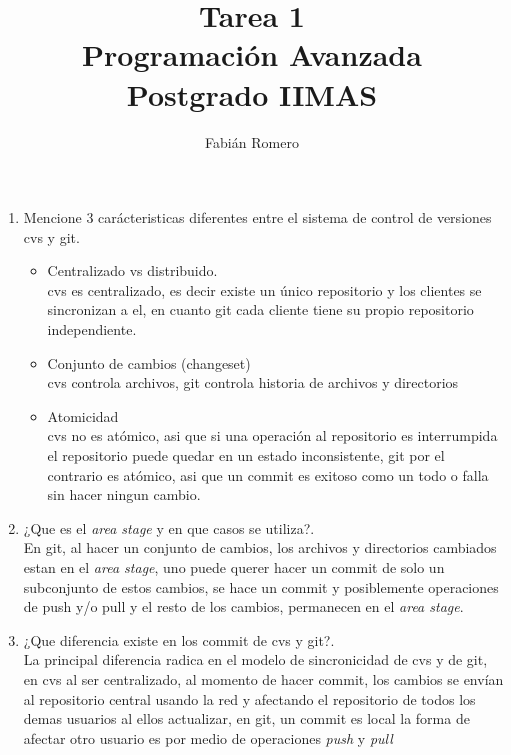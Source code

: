 \documentclass[12pt]{article}
\title{Tarea 1 \\ Programación Avanzada \\ Postgrado IIMAS }
\author{Fabián Romero}
\begin{document}
\lstset{language=bash,basicstyle=\tiny}
\maketitle

\begin{enumerate}
  \item Mencione 3 carácteristicas diferentes entre el sistema de control de versiones cvs y git.

    \begin{itemize}
    \item Centralizado vs distribuido. \hfill \\
cvs es centralizado, es decir existe un único repositorio y los clientes se sincronizan a el, en cuanto git cada cliente
tiene su propio repositorio independiente.

   \item Conjunto de cambios (changeset) \hfill \\
cvs controla archivos, git controla historia de archivos y directorios

    \item Atomicidad \hfill \\
      cvs no es atómico, asi que si una operación al repositorio es interrumpida el repositorio puede quedar en un estado inconsistente, git por el contrario es atómico, asi que un commit es exitoso como un todo o falla sin hacer ningun cambio.
  \end{itemize}


  \item ¿Que es el \emph{area stage} y en que casos se utiliza?.\hfill \\
En git, al hacer un conjunto de cambios, los archivos y directorios cambiados estan en el \emph{area stage}, uno puede querer hacer un commit
de solo un subconjunto de estos cambios, se hace un commit y posiblemente operaciones de push y/o pull y el resto de los cambios, permanecen en el \emph{area stage}.

  \item ¿Que diferencia existe en los commit de cvs y git?. \hfill \\

La principal diferencia radica en el modelo de sincronicidad de cvs y de git, en cvs al ser centralizado, al momento de hacer commit, los cambios
se envían al repositorio central usando la red y afectando el repositorio de todos los demas usuarios al ellos actualizar, en git, un commit es local
la forma de afectar otro usuario es por medio de operaciones \emph{push} y \emph{pull}


\end{enumerate}
\end{document}
